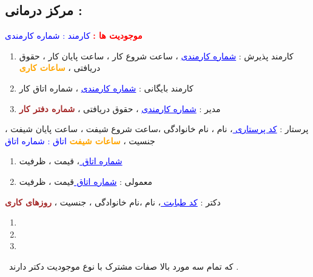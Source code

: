 \documentclass{article}
\begin{document}
	 \subsection*{مرکز درمانی  : }
	 \textcolor{red}{\textbf{موجودیت ها  : }}
	 \newline
	 \newline
	\textcolor{blue}{کارمند  : شماره کارمندی }
	\begin{center}
	\begin{enumerate}
		\item  کارمند پذیرش  : 
		\textcolor{blue}{\underline{شماره کارمندی} }
		، ساعت شروع  کار ،‌ ساعت پایان کار ، حقوق دریافتی  ، 
		\textcolor{orange}{\textbf{ساعات کاری} }
		\item کارمند بایگانی  : 
		\textcolor{blue}{\underline{شماره کارمندی} }
		، شماره اتاق کار 
		\item مدیر   : 
		\textcolor{blue}{\underline{شماره کارمندی} }
		، حقوق دریافتی  ، 
		\textcolor{brown}{\textbf{شماره دفتر کار}}
	\end{enumerate}
	\end{center}
پرستار  : 
\textcolor{blue}{\underline{کد پرستاری }}
، نام ، نام خانوادگی ،‌ساعت شروع شیفت ، ساعت پایان شیفت ، جنسیت ، 
\textcolor{orange}{\textbf{ساعات شیفت} }
\newline
\newline
\textcolor{blue}{اتاق  : شماره اتاق} 
\begin{center}
	\begin{enumerate}
		\item {}
		\textcolor{blue}{\underline{شماره اتاق }} 
		، قیمت ، ظرفیت 
		\item معمولی :‌
		\textcolor{blue}{\underline{شماره اتاق }} 
		قیمت ،‌ ظرفیت 
		
	\end{enumerate}
\end{center}
دکتر ‌: 
\textcolor{blue}{\underline{کد طبابت }}
، نام ،‌نام خانوادگی ، جنسیت ، 
\textcolor{brown}{\textbf{روزهای کاری}}
\begin{center}
	\begin{enumerate}
		\item {}
		\item {}
		\item {}
	\end{enumerate}

\end{center}
 که تمام سه مورد بالا صفات مشترک با نوع موجودیت دکتر دارند  . 
 \newline
\end{document}
